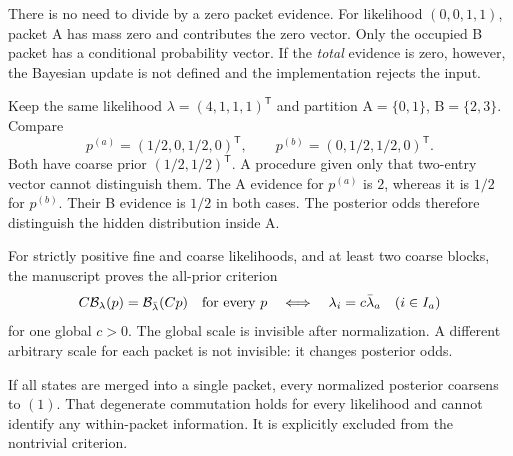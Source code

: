 There is no need to divide by a zero packet evidence. For likelihood $(0,0,1,1)$, packet A has mass zero and contributes the zero vector. Only the occupied B packet has a conditional probability vector. If the \emph{total} evidence is zero, however, the Bayesian update is not defined and the implementation rejects the input.

Keep the same likelihood $\lambda=(4,1,1,1)^{\mathsf T}$ and partition A$=\{0,1\}$, B$=\{2,3\}$. Compare
\[
p^{(a)}=(1/2,0,1/2,0)^{\mathsf T},\qquad
p^{(b)}=(0,1/2,1/2,0)^{\mathsf T}.
\]
Both have coarse prior $(1/2,1/2)^{\mathsf T}$. A procedure given only that two-entry vector cannot distinguish them.
The A evidence for $p^{(a)}$ is $2$, whereas it is $1/2$ for $p^{(b)}$. Their B evidence is $1/2$ in both cases. The posterior odds therefore distinguish the hidden distribution inside A.

For strictly positive fine and coarse likelihoods, and at least two coarse blocks, the manuscript proves the all-prior criterion
\[
C\mathcal B_\lambda(p)=\mathcal B_{\bar\lambda}(Cp)\quad\hbox{for every }p
\quad\Longleftrightarrow\quad
\lambda_i=c\bar\lambda_a\quad(i\in I_a)
\]
for one global $c>0$. The global scale is invisible after normalization. A different arbitrary scale for each packet is not invisible: it changes posterior odds.

If all states are merged into a single packet, every normalized posterior coarsens to $(1)$. That degenerate commutation holds for every likelihood and cannot identify any within-packet information. It is explicitly excluded from the nontrivial criterion.

